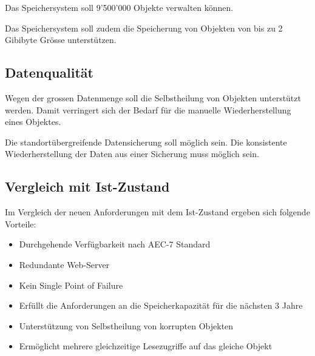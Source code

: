 Das Speichersystem soll 9'500'000 Objekte verwalten können.

Das Speichersystem soll zudem die Speicherung von Objekten von bis zu 2 Gibibyte Grösse unterstützen.

\subsection{Datenqualität}
Wegen der grossen Datenmenge soll die Selbstheilung von Objekten unterstützt werden. Damit verringert sich der Bedarf für die manuelle Wiederherstellung eines Objektes.

Die standortübergreifende Datensicherung soll möglich sein.
Die konsistente Wiederherstellung der Daten aus einer Sicherung muss möglich sein.

\subsection{Vergleich mit Ist-Zustand}
Im Vergleich der neuen Anforderungen mit dem Ist-Zustand ergeben sich folgende Vorteile:

\begin{itemize}
\item Durchgehende Verfügbarkeit nach AEC-7 Standard
\item Redundante Web-Server
\item Kein Single Point of Failure
\item Erfüllt die Anforderungen an die Speicherkapazität für die nächsten 3 Jahre
\item Unterstützung von Selbstheilung von korrupten Objekten
\item Ermöglicht mehrere gleichzeitige Lesezugriffe auf das gleiche Objekt
\end{itemize}